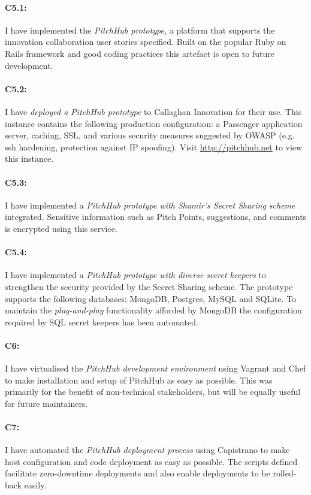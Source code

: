 \paragraph{C5.1:} I have implemented the {\em PitchHub prototype}, a platform that supports the innovation collaboration user stories specified. Built on the popular Ruby on Rails framework and good coding practices this artefact is open to future development.

\paragraph{C5.2:} I have {\em deployed a PitchHub prototype} to Callaghan Innovation for their use. This instance contains the following production configuration: a Passenger application server, caching, SSL, and various security measures suggested by OWASP (e.g. ssh hardening, protection against IP spoofing). Visit \url{http://pitchhub.net} to view this instance.

\paragraph{C5.3:} I have implemented a {\em PitchHub prototype with Shamir's Secret Sharing scheme} integrated. Sensitive information such as Pitch Points, suggestions, and comments is encrypted using this service.

\paragraph{C5.4:} I have implemented a {\em PitchHub prototype with diverse secret keepers} to strengthen the security provided by the Secret Sharing scheme. The prototype supports the following databases: MongoDB, Postgres, MySQL and SQLite. To maintain the \textit{plug-and-play} functionality afforded by MongoDB the configuration required by SQL secret keepers has been automated.

\paragraph{C6:} I have virtualised the {\em PitchHub development environment} using Vagrant and Chef to make installation and setup of PitchHub as easy as possible. This was primarily for the benefit of non-technical stakeholders, but will be equally useful for future maintainers.

\paragraph{C7:} I have automated the {\em PitchHub deployment process} using Capistrano to make host configuration and code deployment as easy as possible. The scripts defined facilitate zero-downtime deployments and also enable deployments to be rolled-back easily.